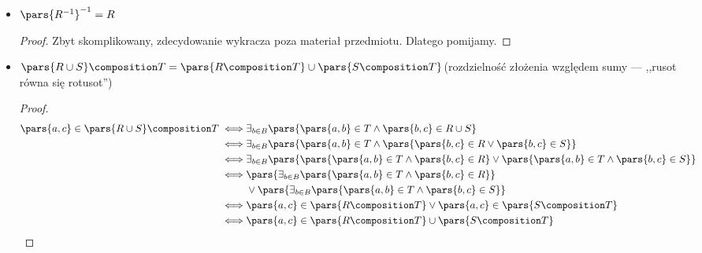 \begin{description}
\begin{itemize}
\begin{proof}
\begin{equation*}
\begin{split}
					            \iff & \pars{b, c} \in R \land \pars{b, c} \in S           \\
					            \iff & \pars{c, b} \in R^{-1} \land \pars{c, b} \in S^{-1} \\
					            \iff & \pars{c, b} \in R^{-1} \cap S^{-1}
				            \end{split}
			            \end{equation*}
		            \end{proof}
		      \item \(\pars{R^{-1}}^{-1} = R\)
		            \begin{proof}
			            Zbyt skomplikowany, zdecydowanie wykracza poza materiał przedmiotu. Dlatego pomijamy.
		            \end{proof}
		      \item \(\pars{R \cup S} \composition T = \pars{R \composition T} \cup \pars{S \composition T}\)\qquad (rozdzielność złożenia względem sumy --- ,,rusot równa się rotusot'')
		            \begin{proof}
			            \begin{equation*}
				            \begin{split}
					            \pars{a, c} \in \pars{R \cup S} \composition T
					            \iff & \exists_{b \in B} \pars{\pars{a, b} \in T \land \pars{b, c} \in R \cup S}                                                       \\
					            \iff & \exists_{b \in B} \pars{\pars{a, b} \in T \land \pars{\pars{b, c} \in R \lor \pars{b, c} \in S}}                                \\
					            \iff & \exists_{b \in B} \pars{\pars{\pars{a, b} \in T \land \pars{b, c} \in R} \lor \pars{\pars{a, b} \in T \land \pars{b, c} \in S}} \\
					            \iff & \pars{\exists_{b \in B} \pars{\pars{a, b} \in T \land \pars{b, c} \in R}}                                                       \\
					                 & \lor \pars{\exists_{b \in B}\pars{\pars{a, b} \in T \land \pars{b, c} \in S}}                                                   \\
					            \iff & \pars{a, c} \in \pars{R \composition T} \lor \pars{a, c} \in \pars{S \composition T}                                            \\
					            \iff & \pars{a, c} \in \pars{R \composition T} \cup \pars{S \composition T}
				            \end{split}

\end{equation*}
\end{proof}
\end{itemize}
\end{description}
